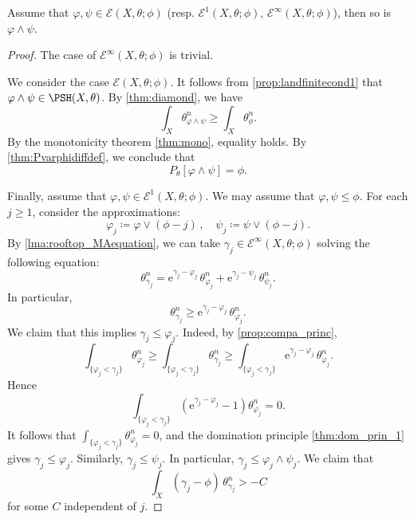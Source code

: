 \begin{proposition}\label{prop:relrooftopclosed}
    Assume that $\varphi,\psi\in \mathcal{E}(X,\theta;\phi)$ (resp. $\mathcal{E}^1(X,\theta;\phi)$, $\mathcal{E}^{\infty}(X,\theta;\phi)$), then so is $\varphi\land \psi$.
\end{proposition}
\begin{proof}
    The case of $\mathcal{E}^{\infty}(X,\theta;\phi)$ is trivial.

    We consider the case $\mathcal{E}(X,\theta;\phi)$. It follows from \cref{prop:landfinitecond1} that $\varphi\land \psi\in \PSH(X,\theta)$. By \cref{thm:diamond}, we have
    \[
        \int_X \theta_{\varphi\land\psi}^n\geq \int_X \theta_{\phi}^n.
    \]
    By the monotonicity theorem \cref{thm:mono}, equality holds. By \cref{thm:Pvarphidiffdef}, we conclude that
    \[
        P_{\theta}[\varphi\land \psi]=\phi.
    \]

    Finally, assume that $\varphi,\psi\in \mathcal{E}^1(X,\theta;\phi)$.
    We may assume that $\varphi,\psi\leq \phi$. For each $j\geq 1$, consider the approximations:
	\[
	\varphi_j\coloneqq \varphi\lor(\phi-j)\,,\quad \psi_j\coloneqq \psi\lor(\phi-j).
	\]
	By \cref{lma:rooftop_MAequation}, we can take $\gamma_j\in \mathcal{E}^{\infty}(X,\theta;\phi)$ solving the following equation:
	\[
	\theta_{\gamma_j}^n=\mathrm{e}^{\gamma_j-\varphi_j}\,\theta_{\varphi_j}^n+\mathrm{e}^{\gamma_j-\psi_j}\,\theta_{\psi_j}^n.
	\]
    In particular,
    \[
        \theta_{\gamma_j}^n\geq \mathrm{e}^{\gamma_j-\varphi_j}\,\theta_{\varphi_j}^n.
    \]
   We claim that this implies $\gamma_j\leq \varphi_j$. Indeed, by \cref{prop:compa_princ},
    \[
        \int_{\{\varphi_j<\gamma_j\}}\theta_{\varphi_j}^n
        \geq
        \int_{\{\varphi_j<\gamma_j\}}\theta_{\gamma_j}^n
        \geq
        \int_{\{\varphi_j<\gamma_j\}}\mathrm{e}^{\gamma_j-\varphi_j}\,\theta_{\varphi_j}^n.
    \]
    Hence
    \[
        \int_{\{\varphi_j<\gamma_j\}}\left(\mathrm{e}^{\gamma_j-\varphi_j}-1\right)\theta_{\varphi_j}^n=0.
    \]
    It follows that $\int_{\{\varphi_j<\gamma_j\}}\theta_{\varphi_j}^n=0$, and the domination principle \cref{thm:dom_prin_1} gives $\gamma_j\leq \varphi_j$. Similarly, $\gamma_j\leq \psi_j$. In particular, $\gamma_j\leq \varphi_j\land \psi_j$.
	We claim that
	\begin{equation}\label{eq:intgammajphi_unif_lower}
		\int_X (\gamma_j-\phi)\,\theta_{\gamma_j}^n >-C
	\end{equation}
    for some $C$ independent of $j$.


\end{proof}
